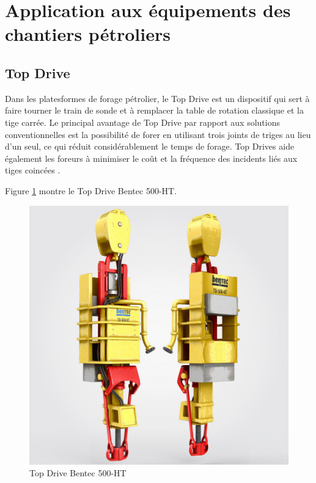\section{Application aux équipements des chantiers pétroliers}%
\label{sec:application_to_oilfield_equipment}

\subsection{Top Drive}%
\label{sub:top_drive}

Dans les platesformes de forage pétrolier, le Top Drive est un dispositif qui sert à faire tourner le train de sonde et à remplacer la table de rotation classique et la tige carrée. Le principal avantage de Top Drive par rapport aux solutions conventionnelles est la possibilité de forer en utilisant trois joints de triges au lieu d'un seul, ce qui réduit considérablement le temps de forage. Top Drives aide également les foreurs à minimiser le coût et la fréquence des incidents liés aux tiges coincées \cite{slbtopdrive}.

Figure \ref{fig:figures/bentec_500_ht} montre le Top Drive Bentec 500-HT.

\begin{figure}[h]
	\centering
	\includegraphics[width=0.9\linewidth]{figures/bentec_500_ht.jpg}
	\caption{Top Drive Bentec 500-HT}%
	\label{fig:figures/bentec_500_ht}
\end{figure}

